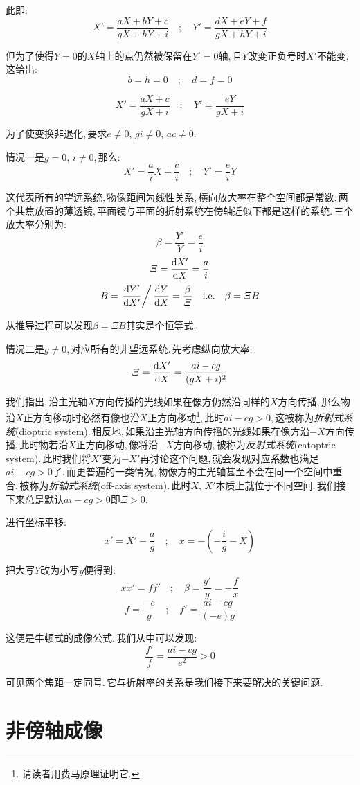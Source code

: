 此即:
\[X'=\frac{aX+bY+c}{gX+hY+i}\quad;\quad Y'=\frac{dX+eY+f}{gX+hY+i}\]

但为了使得\(Y=0\)的\(X\)轴上的点仍然被保留在\(Y'=0\)轴,\,且\(Y\)改变正负号时\(X'\)不能变,\,这给出:
\[b=h=0\quad;\quad d=f=0\]

\[X'=\frac{aX+c}{gX+i}\quad;\quad Y'=\frac{eY}{gX+i}\]

为了使变换非退化,\,要求\(e\neq 0,\,gi\neq 0,\,ac\neq 0\).

情况一是\(g=0,\,i\neq 0\),\,那么:
\[X'=\frac{a}{i}X+\frac{c}{i}\quad ;\quad Y'=\frac{e}{i}Y\]

这代表所有的望远系统,\,物像距间为线性关系,\,横向放大率在整个空间都是常数.\,两个共焦放置的薄透镜,\,平面镜与平面的折射系统在傍轴近似下都是这样的系统.\,三个放大率分别为:
\[\beta=\frac{Y'}{Y}=\frac{e}{i}\]
\[\varXi=\frac{\textrm{d} X'}{\textrm{d} X}=\frac{a}{i}\]
\[B=\left.\frac{\textrm{d} Y'}{\textrm{d} X'}\right/ \frac{\textrm{d} Y}{\textrm{d} X}=\frac{\beta}{\varXi}\quad {\rm i.e.}\quad\beta=\varXi B\]

从推导过程可以发现\(\beta=\varXi B\)其实是个恒等式.

情况二是\(g\neq 0\),\,对应所有的非望远系统.\,先考虑纵向放大率:
\[\varXi=\frac{\textrm{d} X'}{\textrm{d} X}=\frac{ai-cg}{(gX+i)^2}\]

我们指出,\,沿主光轴\(X\)方向传播的光线如果在像方仍然沿同样的\(X\)方向传播,\,那么物沿\(X\)正方向移动时必然有像也沿\(X\)正方向移动\footnote{请读者用费马原理证明它.},\,此时\(ai-cg>0\),\,这被称为\emph{折射式系统}(dioptric system).\,相反地,\,如果沿主光轴方向传播的光线如果在像方沿\(-X\)方向传播,\,此时物若沿\(X\)正方向移动,\,像将沿\(-X\)方向移动,\,被称为\emph{反射式系统}(catoptric system).\,此时我们将\(X'\)变为\(-X'\)再讨论这个问题,\,就会发现对应系数也满足\(ai-cg>0\)了.\,而更普遍的一类情况,\,物像方的主光轴甚至不会在同一个空间中重合,\,被称为\emph{折轴式系统}(off-axis system).\,此时\(X,\,X'\)本质上就位于不同空间.\,我们接下来总是默认\(ai-cg>0\)即\(\varXi>0\).

进行坐标平移:
\[x'=X'-\frac{a}{g}\quad;\quad x=-(-\frac{i}{g}-X)\]

把大写\(Y\)改为小写\(y\)便得到:
\[xx'=ff'\quad;\quad \beta=\frac{y'}{y}=-\frac{f}{x}\]
\[f=\frac{-e}{g}\quad;\quad f'=\frac{ai-cg}{(-e)g}\]

这便是牛顿式的成像公式.\,我们从中可以发现:
\[\frac{f'}{f}=\frac{ai-cg}{e^2}>0\]

可见两个焦距一定同号.\,它与折射率的关系是我们接下来要解决的关键问题.






\section{非傍轴成像}